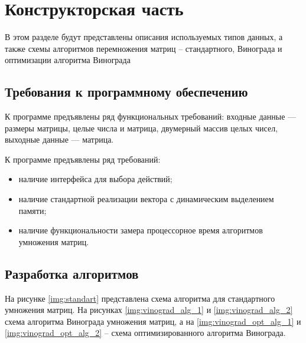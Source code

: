 \chapter{Конструкторская часть}

В этом разделе будут представлены описания используемых типов данных, а также схемы алгоритмов перемножения матриц – стандартного, Винограда и оптимизации алгоритма Винограда

\section{Требования к программному обеспечению}
К программе предъявлены ряд функциональных требований: входные данные --- размеры матрицы, целые числа и матрица, двумерный массив целых чисел, выходные данные --- матрица.

К программе предъявлены ряд требований:

\begin{itemize}[label=---]
	\item наличие интерфейса для выбора действий;
	\item наличие стандартной реализации вектора с динамическим выделением памяти;
	\item наличие функциональности замера процессорное время алгоритмов умножения матриц.
\end{itemize}

\section{Разработка алгоритмов}

На рисунке \ref{img:standart} представлена схема алгоритма для стандартного умножения матриц. На рисунках \ref{img:vinograd_alg_1} и \ref{img:vinograd_alg_2} схема алгоритма Винограда умножения матриц, а на \ref{img:vinograd_opt_alg_1} и \ref{img:vinograd_opt_alg_2} -- схема оптимизированного алгоритма Винограда.

\clearpage
{}
\clearpage
{}
\clearpage
{}
\clearpage
{}
\clearpage


